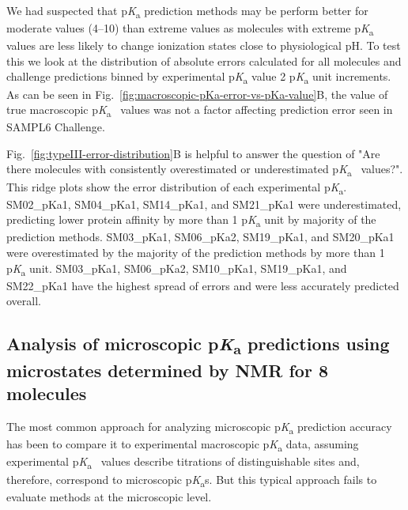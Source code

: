 \documentclass[9pt,lineno,final]{elife}
\newcommand{\pKa}{p\textit{K}\textsubscript{a}}
\begin{document}
We had suspected that \pKa{} prediction methods may be perform better for moderate values (4--10) than extreme values as molecules with extreme \pKa{}~ values are less likely to change ionization states close to physiological pH. 
To test this we look at the distribution of absolute errors calculated for all molecules and challenge predictions binned by experimental \pKa{} value 2 \pKa{} unit increments. 
As can be seen in Fig.~\ref{fig:macroscopic-pKa-error-vs-pKa-value}B, the value of true macroscopic \pKa{}~ values was not a factor affecting prediction error seen in SAMPL6 Challenge.

Fig.~\ref{fig:typeIII-error-distribution}B is helpful to answer the question of "Are there molecules with consistently overestimated or underestimated \pKa{}~ values?". 
This ridge plots show the error distribution of each experimental \pKa{}. 
SM02\_pKa1, SM04\_pKa1, SM14\_pKa1, and SM21\_pKa1 were underestimated, predicting lower protein affinity by more than 1 \pKa{} unit by majority of the prediction methods. 
SM03\_pKa1, SM06\_pKa2, SM19\_pKa1, and SM20\_pKa1 were overestimated by the majority of the prediction methods by more than 1 \pKa{} unit.
SM03\_pKa1, SM06\_pKa2, SM10\_pKa1, SM19\_pKa1, and SM22\_pKa1 have the highest spread of errors and were less accurately predicted overall. 



\subsection{Analysis of microscopic \pKa{} predictions using microstates determined by NMR for 8 molecules}

The most common approach for analyzing microscopic \pKa{} prediction accuracy has been to compare it to experimental macroscopic \pKa{} data, assuming experimental \pKa{}~ values describe titrations of distinguishable sites and, therefore, correspond to microscopic \pKa{}s. 
But this typical approach fails to evaluate methods at the microscopic level.
\end{document}
